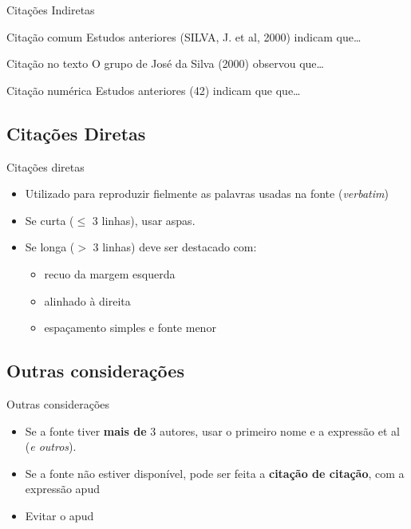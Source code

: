 \documentclass{beamer}
\begin{document}
\begin{frame}{Citações Indiretas}
  \begin{exampleblock}{Citação comum}
    Estudos anteriores \alert{(SILVA, J. et al, 2000)} indicam
    que\ldots
  \end{exampleblock}
  \bigskip
  \begin{exampleblock}{Citação no texto}
    O grupo de José da Silva \alert{(2000)} observou que\ldots
  \end{exampleblock}
  \bigskip
  \begin{exampleblock}{Citação numérica}
    Estudos anteriores \alert{(42)} indicam que que\ldots
  \end{exampleblock}
\end{frame}

\subsection{Citações Diretas}

\begin{frame}{Citações diretas}
  \begin{itemize}
    \footnotesize
  \item Utilizado para reproduzir fielmente as palavras usadas na
    fonte ({\em verbatim})
    \bigskip
  \item Se curta ($\leq$ 3 linhas), usar aspas.
    \bigskip
  \item Se longa ($>$ 3 linhas) deve ser destacado com:
    \begin{itemize}
      \scriptsize
    \item recuo da margem esquerda
    \item alinhado à direita
    \item espaçamento simples e fonte menor
    \end{itemize}
  \end{itemize}
\end{frame}

\subsection{Outras considerações}

\begin{frame}{Outras considerações}
  \begin{itemize}
    \footnotesize
  \item Se a fonte tiver {\bf mais de} 3 autores, usar o primeiro nome
    e a expressão \alert{et al} ({\em e outros}).
  \item Se a fonte não estiver disponível, pode ser feita a {\bf
      citação de citação}, com a expressão \alert{apud}
  \item Evitar o apud
  \end{itemize}
\end{frame}
\end{document}
